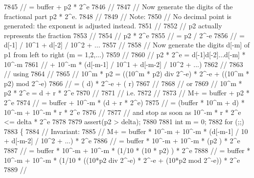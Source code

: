 \begin{DoxyCode}
7845     \textcolor{comment}{//         = buffer            + p2 * 2^e}
7846     \textcolor{comment}{//}
7847     \textcolor{comment}{// Now generate the digits of the fractional part p2 * 2^e.}
7848     \textcolor{comment}{//}
7849     \textcolor{comment}{// Note:}
7850     \textcolor{comment}{// No decimal point is generated: the exponent is adjusted instead.}
7851     \textcolor{comment}{//}
7852     \textcolor{comment}{// p2 actually represents the fraction}
7853     \textcolor{comment}{//}
7854     \textcolor{comment}{//      p2 * 2^e}
7855     \textcolor{comment}{//          = p2 / 2^-e}
7856     \textcolor{comment}{//          = d[-1] / 10^1 + d[-2] / 10^2 + ...}
7857     \textcolor{comment}{//}
7858     \textcolor{comment}{// Now generate the digits d[-m] of p1 from left to right (m = 1,2,...)}
7859     \textcolor{comment}{//}
7860     \textcolor{comment}{//      p2 * 2^e = d[-1]d[-2]...d[-m] * 10^-m}
7861     \textcolor{comment}{//                      + 10^-m * (d[-m-1] / 10^1 + d[-m-2] / 10^2 + ...)}
7862     \textcolor{comment}{//}
7863     \textcolor{comment}{// using}
7864     \textcolor{comment}{//}
7865     \textcolor{comment}{//      10^m * p2 = ((10^m * p2) div 2^-e) * 2^-e + ((10^m * p2) mod 2^-e)}
7866     \textcolor{comment}{//                = (                   d) * 2^-e + (                   r)}
7867     \textcolor{comment}{//}
7868     \textcolor{comment}{// or}
7869     \textcolor{comment}{//      10^m * p2 * 2^e = d + r * 2^e}
7870     \textcolor{comment}{//}
7871     \textcolor{comment}{// i.e.}
7872     \textcolor{comment}{//}
7873     \textcolor{comment}{//      M+ = buffer + p2 * 2^e}
7874     \textcolor{comment}{//         = buffer + 10^-m * (d + r * 2^e)}
7875     \textcolor{comment}{//         = (buffer * 10^m + d) * 10^-m + 10^-m * r * 2^e}
7876     \textcolor{comment}{//}
7877     \textcolor{comment}{// and stop as soon as 10^-m * r * 2^e <= delta * 2^e}
7878 
7879     assert(p2 > delta);
7880 
7881     \textcolor{keywordtype}{int} m = 0;
7882     \textcolor{keywordflow}{for} (;;)
7883     \{
7884         \textcolor{comment}{// Invariant:}
7885         \textcolor{comment}{//      M+ = buffer * 10^-m + 10^-m * (d[-m-1] / 10 + d[-m-2] / 10^2 + ...) * 2^e}
7886         \textcolor{comment}{//         = buffer * 10^-m + 10^-m * (p2                                 ) * 2^e}
7887         \textcolor{comment}{//         = buffer * 10^-m + 10^-m * (1/10 * (10 * p2)                   ) * 2^e}
7888         \textcolor{comment}{//         = buffer * 10^-m + 10^-m * (1/10 * ((10*p2 div 2^-e) * 2^-e + (10*p2 mod 2^-e)) * 2^e}
7889         \textcolor{comment}{//}

\end{DoxyCode}
